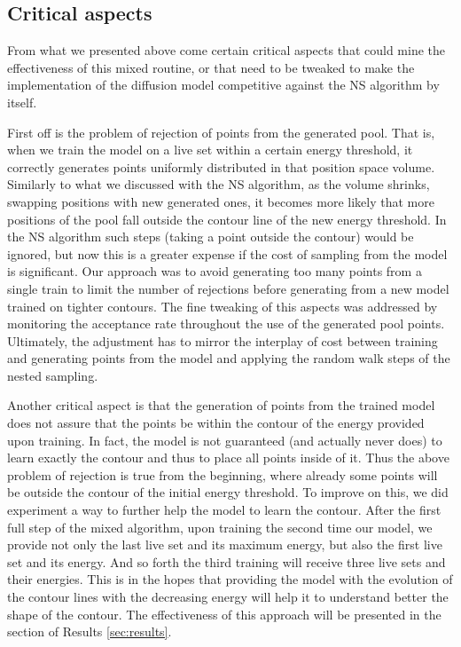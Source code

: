 \documentclass[a4paper, 12pt]{article}          %
\begin{document}
\subsection{Critical aspects}
From what we presented above come certain critical aspects that could mine the effectiveness of this mixed routine, or that need to be tweaked to make the implementation of the diffusion model competitive against the NS algorithm by itself.

First off is the problem of rejection of points from the generated pool. That is, when we train the model on a live set within a certain energy threshold, it correctly generates points uniformly distributed in that position space volume. Similarly to what we discussed with the NS algorithm, as the volume shrinks, swapping positions with new generated ones, it becomes more likely that more positions of the pool fall outside the contour line of the new energy threshold. In the NS algorithm such steps (taking a point outside the contour) would be ignored, but now this is a greater expense if the cost of sampling from the model is significant. Our approach was to avoid generating too many points from a single train to limit the number of rejections before generating from a new model trained on tighter contours. The fine tweaking of this aspects was addressed by monitoring the acceptance rate throughout the use of the generated pool points. Ultimately, the adjustment has to mirror the interplay of cost between training and generating points from the model and applying the random walk steps of the nested sampling. 

Another critical aspect is that the generation of points from the trained model does not assure that the points be within the contour of the energy provided upon training. In fact, the model is not guaranteed (and actually never does) to learn exactly the contour and thus to place all points inside of it. Thus the above problem of rejection is true from the beginning, where already some points will be outside the contour of the initial energy threshold. To improve on this, we did experiment a way to further help the model to learn the contour. After the first full step of the mixed algorithm, upon training the second time our model, we provide not only the last live set and its maximum energy, but also the first live set and its energy. And so forth the third training will receive three live sets and their energies. This is in the hopes that providing the model with the evolution of the contour lines with the decreasing energy will help it to understand better the shape of the contour. The effectiveness of this approach will be presented in the section of Results \ref{sec:results}. 
\end{document}
